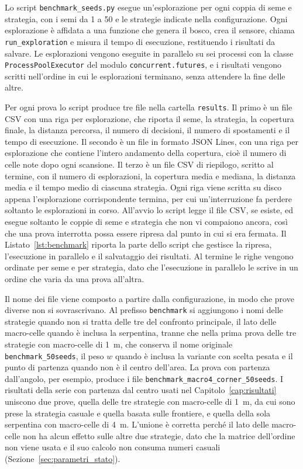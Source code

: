 Lo script \texttt{benchmark\_seeds.py} esegue un'esplorazione per ogni coppia di seme e strategia, con i semi da 1 a 50 e le strategie indicate nella configurazione. Ogni esplorazione è affidata a una funzione che genera il bosco, crea il sensore, chiama \texttt{run\_exploration} e misura il tempo di esecuzione, restituendo i risultati da salvare. Le esplorazioni vengono eseguite in parallelo su sei processi con la classe \texttt{ProcessPoolExecutor} del modulo \texttt{concurrent.futures}, e i risultati vengono scritti nell'ordine in cui le esplorazioni terminano, senza attendere la fine delle altre.

Per ogni prova lo script produce tre file nella cartella \texttt{results}. Il primo è un file CSV con una riga per esplorazione, che riporta il seme, la strategia, la copertura finale, la distanza percorsa, il numero di decisioni, il numero di spostamenti e il tempo di esecuzione. Il secondo è un file in formato JSON Lines, con una riga per esplorazione che contiene l'intero andamento della copertura, cioè il numero di celle note dopo ogni scansione. Il terzo è un file CSV di riepilogo, scritto al termine, con il numero di esplorazioni, la copertura media e mediana, la distanza media e il tempo medio di ciascuna strategia. Ogni riga viene scritta su disco appena l'esplorazione corrispondente termina, per cui un'interruzione fa perdere soltanto le esplorazioni in corso. All'avvio lo script legge il file CSV, se esiste, ed esegue soltanto le coppie di seme e strategia che non vi compaiono ancora, così che una prova interrotta possa essere ripresa dal punto in cui si era fermata. Il Listato~\ref{lst:benchmark} riporta la parte dello script che gestisce la ripresa, l'esecuzione in parallelo e il salvataggio dei risultati. Al termine le righe vengono ordinate per seme e per strategia, dato che l'esecuzione in parallelo le scrive in un ordine che varia da una prova all'altra.

Il nome dei file viene composto a partire dalla configurazione, in modo che prove diverse non si sovrascrivano. Al prefisso \texttt{benchmark} si aggiungono i nomi delle strategie quando non si tratta delle tre del confronto principale, il lato delle macro-celle quando è inclusa la serpentina, tranne che nella prima prova delle tre strategie con macro-celle di 1~m, che conserva il nome originale \texttt{benchmark\_50seeds}, il peso $w$ quando è inclusa la variante con scelta pesata e il punto di partenza quando non è il centro dell'area. La prova con partenza dall'angolo, per esempio, produce i file \texttt{benchmark\_macro4\_corner\_50seeds}. I risultati della serie con partenza dal centro usati nel Capitolo~\ref{cap:risultati} uniscono due prove, quella delle tre strategie con macro-celle di 1~m, da cui sono prese la strategia casuale e quella basata sulle frontiere, e quella della sola serpentina con macro-celle di 4~m. L'unione è corretta perché il lato delle macro-celle non ha alcun effetto sulle altre due strategie, dato che la matrice dell'ordine non viene usata e il suo calcolo non consuma numeri casuali (Sezione~\ref{sec:parametri_stato}).

